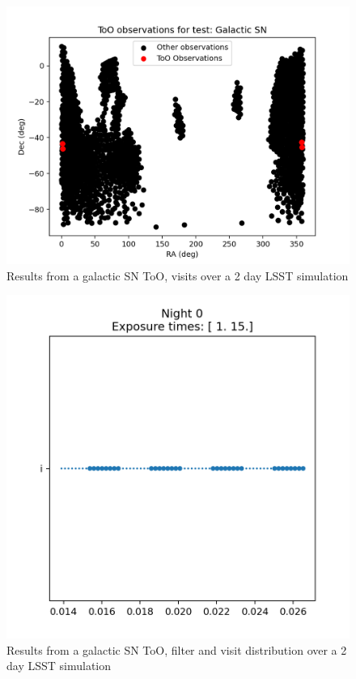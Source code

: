 \begin{figure}
    \centering
    \includegraphics[width=\linewidth]{figures/validationTests/SVRequired/GalacticSNPosition.png}
    \caption{Results from a galactic SN ToO, visits over a 2 day LSST simulation}
    \label{fig:GalacticSNPositionResult}
\end{figure}

\begin{figure}
    \centering
    \includegraphics[width=\linewidth]{figures/validationTests/SVRequired/GalacticSNFilterPlot.png}
    \caption{Results from a galactic SN ToO, filter and visit distribution over a 2 day LSST simulation}
    \label{fig:GalacticSNFilterResult}
\end{figure}
\newpage
